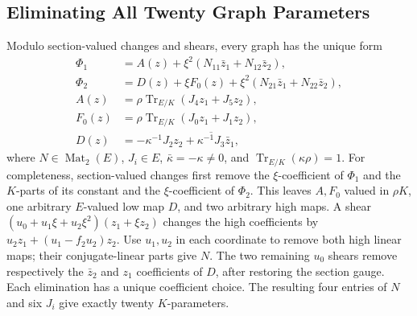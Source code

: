 \documentclass[12pt,letterpaper,onecolumn]{article}
\theoremstyle{definition}
\theoremstyle{remark}
\DeclareMathOperator{\Tr}{Tr}
\begin{document}
\subsection{Eliminating All Twenty Graph Parameters}
Modulo section-valued changes and shears, every graph has the unique form
\begin{align*}
\Phi_1&=A(z)+\xi^2(N_{11}\bar z_1+N_{12}\bar z_2),\\
\Phi_2&=D(z)+\xi F_0(z)+\xi^2(N_{21}\bar z_1+N_{22}\bar z_2),\\
A(z)&=\rho\Tr_{E/K}(J_4z_1+J_5z_2),\\
F_0(z)&=\rho\Tr_{E/K}(J_0z_1+J_1z_2),\\
D(z)&=-\kappa^{-1}J_2z_2+\overline{\kappa^{-1}J_3}\bar z_1,
\end{align*}
where \(N\in\operatorname{Mat}_2(E)\), \(J_i\in E\),
\(\bar\kappa=-\kappa\ne0\), and \(\Tr_{E/K}(\kappa\rho)=1\).
For completeness, section-valued changes first remove the \(\xi\)-coefficient of \(\Phi_1\) and the \(K\)-parts of its constant and the \(\xi\)-coefficient of \(\Phi_2\).
This leaves \(A,F_0\) valued in \(\rho K\), one arbitrary \(E\)-valued low map \(D\), and two arbitrary high maps.
A shear \((u_0+u_1\xi+u_2\xi^2)(z_1+\xi z_2)\) changes the high coefficients by
\(u_2z_1+(u_1-f_2u_2)z_2\).
Use \(u_1,u_2\) in each coordinate to remove both high linear maps; their conjugate-linear parts give \(N\).
The two remaining \(u_0\) shears remove respectively the \(\bar z_2\) and \(z_1\) coefficients of \(D\), after restoring the section gauge.
Each elimination has a unique coefficient choice. The resulting four entries of \(N\) and six \(J_i\) give exactly twenty \(K\)-parameters.
\end{document}
